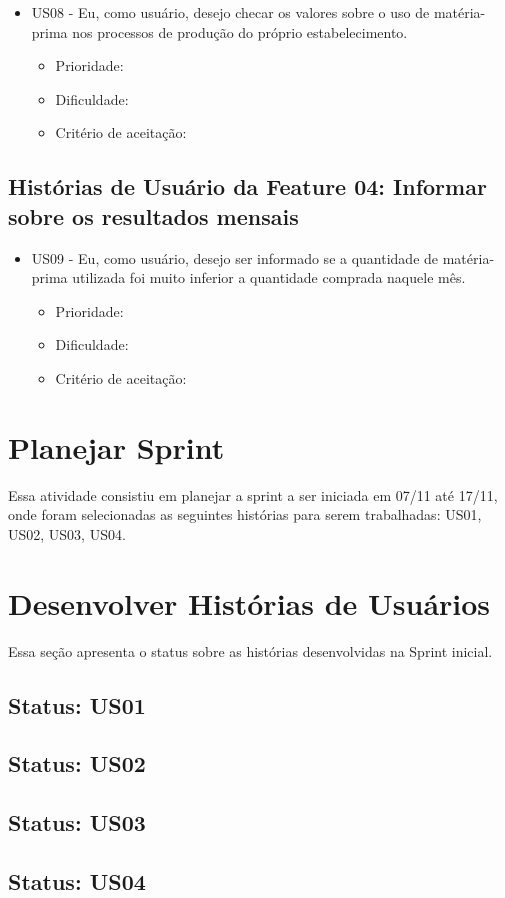 \begin{itemize}

\item US08 - Eu, como usuário, desejo checar os valores sobre o uso de matéria-prima nos processos de produção do próprio estabelecimento.
    \begin{itemize}
    \item Prioridade:
    \item Dificuldade:
    \item Critério de aceitação:
    \end{itemize}


\end{itemize}


\subsection{Histórias de Usuário da Feature 04: Informar sobre os resultados mensais}

\begin{itemize}

\item US09 - Eu, como usuário, desejo ser informado se a quantidade de matéria-prima utilizada foi muito inferior a quantidade comprada naquele mês.
    \begin{itemize}
    \item Prioridade:
    \item Dificuldade:
    \item Critério de aceitação:
    \end{itemize}


\end{itemize}


\section{Planejar Sprint}
Essa atividade consistiu em planejar a sprint a ser iniciada em 07/11 até 17/11, onde foram selecionadas as seguintes histórias para serem trabalhadas: US01, US02, US03, US04.

\section{Desenvolver Histórias de Usuários}
Essa seção apresenta o status sobre as histórias desenvolvidas na Sprint inicial.

\subsection{Status: US01}

\subsection{Status: US02}

\subsection{Status: US03}

\subsection{Status: US04}
